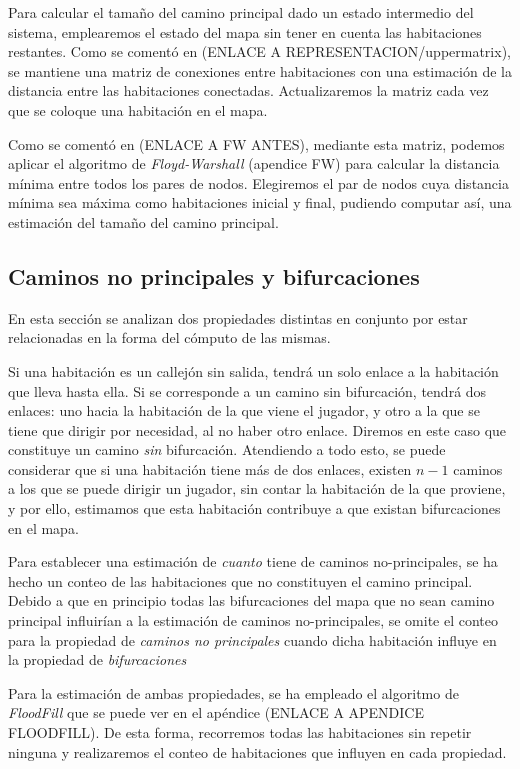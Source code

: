 Para calcular el tamaño del camino principal dado un estado intermedio del sistema, emplearemos el estado del mapa sin tener en cuenta las habitaciones restantes. Como se comentó en (ENLACE A REPRESENTACION/uppermatrix), se mantiene una matriz de conexiones entre habitaciones con una estimación de la distancia entre las habitaciones conectadas. Actualizaremos la matriz cada vez que se coloque una habitación en el mapa.

Como se comentó en (ENLACE A FW ANTES), mediante esta matriz, podemos aplicar el algoritmo de \emph{Floyd-Warshall} (apendice FW) para calcular la distancia mínima entre todos los pares de nodos. Elegiremos el par de nodos cuya distancia mínima sea máxima como habitaciones inicial y final, pudiendo computar así, una estimación del tamaño del camino principal.

\subsection{Caminos no principales y bifurcaciones}

En esta sección se analizan dos propiedades distintas en conjunto por estar relacionadas en la forma del cómputo de las mismas.


Si una habitación es un callejón sin salida, tendrá un solo enlace a la habitación que lleva hasta ella. Si se corresponde a un camino sin bifurcación, tendrá dos enlaces: uno hacia la habitación de la que viene el jugador, y otro a la que se tiene que dirigir por necesidad, al no haber otro enlace. Diremos en este caso que constituye un camino \emph{sin} bifurcación. Atendiendo a todo esto, se puede considerar que si una habitación tiene más de dos enlaces, existen $n-1$ caminos a los que se puede dirigir un jugador, sin contar la habitación de la que proviene, y por ello, estimamos que esta habitación contribuye a que existan bifurcaciones en el mapa.

Para establecer una estimación de \emph{cuanto} tiene de caminos no-principales, se ha hecho un conteo de las habitaciones que no constituyen el camino principal. Debido a que en principio todas las bifurcaciones del mapa que no sean camino principal influirían a la estimación de caminos no-principales, se omite el conteo para la propiedad de \emph{caminos no principales} cuando dicha habitación influye en la propiedad de \emph{bifurcaciones}

Para la estimación de ambas propiedades, se ha empleado el algoritmo de \emph{FloodFill} que se puede ver en el apéndice (ENLACE A APENDICE FLOODFILL). De esta forma, recorremos todas las habitaciones sin repetir ninguna y realizaremos el conteo de habitaciones que influyen en cada propiedad.


